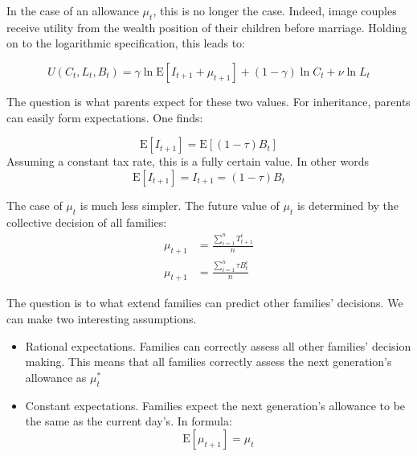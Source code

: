 In the case of an allowance $\mu_t$, this is no longer the case. Indeed, image couples receive utility from the wealth position of their children before marriage. Holding on to the logarithmic specification, this leads to:

\begin{equation}
    U(C_t,L_t,B_t) = \gamma \ln \mathrm{E}[I_{t+1} + \mu_{t+1}] + (1-\gamma) \ln C_t + \nu \ln L_t
    \label{eq:U}
\end{equation}

The question is what parents expect for these two values. For inheritance, parents can easily form expectations. One finds:

\begin{equation}
    \mathrm{E}[I_{t+1}] = \mathrm{E}[(1-\tau)B_t]
\end{equation}
Assuming a constant tax rate, this is a fully certain value. In other words
\begin{equation}
    \mathrm{E}[I_{t+1}] = I_{t+1} = (1-\tau)B_t
\end{equation}

The case of $\mu_t$ is much less simpler. The future value of $\mu_t$ is determined by the collective decision of all families:
\begin{align}
    \mu_{t+1} &= \frac{\sum\limits_{i=1}^n T_{t+1}^i}{n} \\
    \mu_{t+1} &= \frac{\sum\limits_{i=1}^n \tau B_t^i}{n}
\end{align}

The question is to what extend families can predict other families' decisions. We can make two interesting assumptions.

\begin{itemize}
    \item Rational expectations. Families can correctly assess all other families' decision making. This means that all families correctly assess the next generation's allowance as $\mu_t^*$
    \item Constant expectations. Families expect the next generation's allowance to be the same as the current day's. In formula:
    \begin{equation}
        \mathrm{E}[\mu_{t+1}] = \mu_t
    \end{equation}
\end{itemize}
